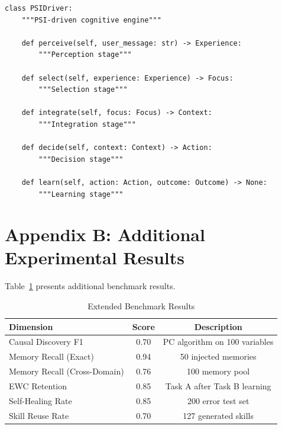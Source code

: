 \documentclass[10pt,twocolumn,letterpaper]{article}
\begin{document}
\begin{verbatim}
class PSIDriver:
    """PSI-driven cognitive engine"""
    
    def perceive(self, user_message: str) -> Experience:
        """Perception stage"""
        
    def select(self, experience: Experience) -> Focus:
        """Selection stage"""
        
    def integrate(self, focus: Focus) -> Context:
        """Integration stage"""
        
    def decide(self, context: Context) -> Action:
        """Decision stage"""
        
    def learn(self, action: Action, outcome: Outcome) -> None:
        """Learning stage"""
\end{verbatim}

\newpage
\section*{Appendix B: Additional Experimental Results}

Table~\ref{tab:additional_results} presents additional benchmark results.

\begin{table}[h]
    \caption{Extended Benchmark Results}
    \label{tab:additional_results}
    \centering
    \begin{small}
    \begin{tabular}{lcc}
        \toprule
        \textbf{Dimension} & \textbf{Score} & \textbf{Description} \\
        \midrule
        Causal Discovery F1 & 0.70 & PC algorithm on 100 variables \\
        Memory Recall (Exact) & 0.94 & 50 injected memories \\
        Memory Recall (Cross-Domain) & 0.76 & 100 memory pool \\
        EWC Retention & 0.85 & Task A after Task B learning \\
        Self-Healing Rate & 0.85 & 200 error test set \\
        Skill Reuse Rate & 0.70 & 127 generated skills \\
        \bottomrule
    \end{tabular}
    \end{small}
\end{table}

\end{document}
